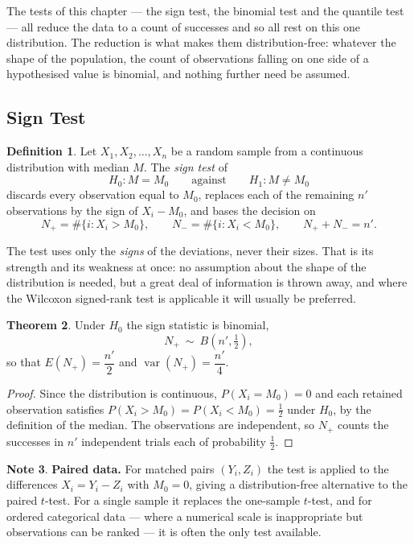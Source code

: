 \documentclass[11pt,a4paper]{article}
\theoremstyle{definition}
\newtheorem{thm}{Theorem}[section]
\newtheorem{definition}[thm]{Definition}
\newtheorem{note}[thm]{Note}
\begin{document}
The tests of this chapter --- the sign test, the binomial test and the quantile
test --- all reduce the data to a count of successes and so all rest on this one
distribution. The reduction is what makes them distribution-free: whatever the
shape of the population, the count of observations falling on one side of a
hypothesised value is binomial, and nothing further need be assumed.









\subsection{Sign Test}

\begin{definition}
Let $X_1, X_2, \ldots, X_n$ be a random sample from a continuous distribution with
median $M$. The \emph{sign test} of
$$H_0 : M = M_0 \qquad\text{against}\qquad H_1 : M \neq M_0$$
discards every observation equal to $M_0$, replaces each of the remaining $n'$
observations by the sign of $X_i - M_0$, and bases the decision on
$$N_{+} = \#\{i : X_i > M_0\},
\qquad
N_{-} = \#\{i : X_i < M_0\},
\qquad N_{+} + N_{-} = n' .$$
\end{definition}

The test uses only the \emph{signs} of the deviations, never their sizes. That is
its strength and its weakness at once: no assumption about the shape of the
distribution is needed, but a great deal of information is thrown away, and where
the Wilcoxon signed-rank test is applicable it will usually be preferred.

\begin{thm}
Under $H_0$ the sign statistic is binomial,
$$N_{+} \ \sim\ B\!\left(n', \tfrac12\right),$$
so that $E(N_{+}) = \dfrac{n'}{2}$ and
$\operatorname{var}(N_{+}) = \dfrac{n'}{4}$.
\end{thm}

\begin{proof}
Since the distribution is continuous, $P(X_i = M_0) = 0$ and each retained
observation satisfies $P(X_i > M_0) = P(X_i < M_0) = \tfrac12$ under $H_0$, by the
definition of the median. The observations are independent, so $N_{+}$ counts the
successes in $n'$ independent trials each of probability $\tfrac12$.
\end{proof}

\begin{note}
\textbf{Paired data.} For matched pairs $(Y_i, Z_i)$ the test is applied to the
differences $X_i = Y_i - Z_i$ with $M_0 = 0$, giving a distribution-free
alternative to the paired $t$-test. For a single sample it replaces the one-sample
$t$-test, and for ordered categorical data --- where a numerical scale is
inappropriate but observations can be ranked --- it is often the only test
available.
\end{note}
\end{document}

